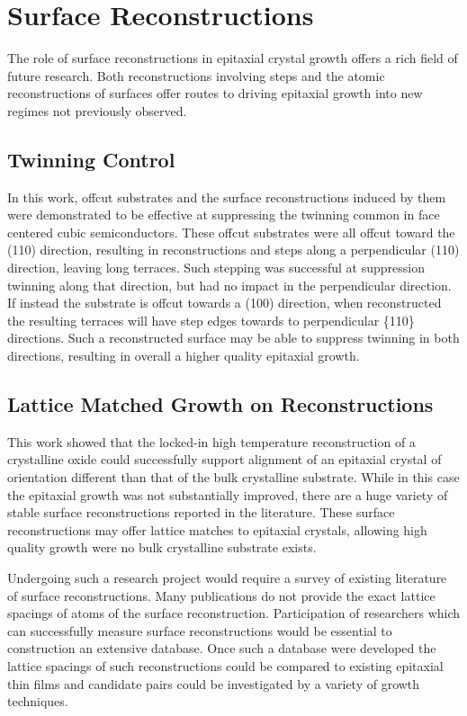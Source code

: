 \section{Surface Reconstructions}
The role of surface reconstructions in epitaxial crystal growth offers a rich field of future research.
Both reconstructions involving steps and the atomic reconstructions of surfaces offer routes to driving epitaxial growth into new regimes not previously observed.
\subsection{Twinning Control} In this work, offcut substrates and the surface reconstructions induced by them were demonstrated to be effective at suppressing the twinning common in face centered cubic semiconductors.
These offcut substrates were all offcut toward the (110) direction, resulting in reconstructions and steps along a perpendicular (110) direction, leaving long terraces.
Such stepping was successful at suppression twinning along that direction, but had no impact in the perpendicular direction.
If instead the substrate is offcut towards a (100) direction, when reconstructed the resulting terraces will have step edges towards to perpendicular \{110\} directions.
Such a reconstructed surface may be able to suppress twinning in both directions, resulting in overall a higher quality epitaxial growth.
\subsection{Lattice Matched Growth on Reconstructions} This work showed that the locked-in high temperature reconstruction of a crystalline oxide could successfully support alignment of an epitaxial crystal of orientation different than that of the bulk crystalline substrate.
While in this case the epitaxial growth was not substantially improved, there are a huge variety of stable surface reconstructions reported in the literature.
These surface reconstructions may offer lattice matches to epitaxial crystals, allowing high quality growth were no bulk crystalline substrate exists.

Undergoing such a research project would require a survey of existing literature of surface reconstructions.
Many publications do not provide the exact lattice spacings of atoms of the surface reconstruction.
Participation of researchers which can successfully measure surface reconstructions would be essential to construction an extensive database.
Once such a database were developed the lattice spacings of such reconstructions could be compared to existing epitaxial thin films and candidate pairs could be investigated by a variety of growth techniques.

